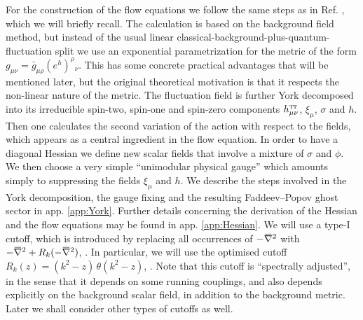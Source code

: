 \documentclass[11pt]{book} %
\newcommand{\overbar}[1]{\mkern 1.5mu\overline{\mkern-1.5mu#1\mkern-1.5mu}\mkern 1.5mu}
\newcommand\TTspace{ -1pt }
\newcommand\hTTmunu{ h^{\scriptscriptstyle{\mathrm{T\hspace{\TTspace}T}}}_{\mu\nu} }
\newcommand{\bnabla}{\overbar \nabla}
\numberwithin{equation}{chapter}
\begin{document}
For the construction of the flow equations we follow the same steps
as in Ref. \cite{Percacci:2015wwa}, which we will briefly recall.
The calculation is based on the background field method,
but instead of the usual linear classical-background-plus-quantum-fluctuation split we
use an exponential parametrization for the metric of the form
$g_{\mu\nu} = \bar g_{\mu\rho}(e^h)^\rho{}_\nu$.
This has some concrete practical advantages that will be mentioned later,
but the original theoretical motivation is that it
respects the non-linear nature of the metric.
The fluctuation field is further York decomposed into its irreducible
spin-two, spin-one and spin-zero components $\hTTmunu$,
$\xi_\mu$, $\sigma$ and $h$.
Then one calculates the second variation of the action with
respect to the fields, which appears as a central ingredient
in the flow equation.
In order to have a diagonal Hessian we define new scalar fields
that involve a mixture of $\sigma$ and $\phi$.
We then choose a very simple ``unimodular physical gauge''
which amounts simply to suppressing the fields $\xi_\mu$ and $h$.
We describe the steps involved in the York decomposition, the
gauge fixing and the resulting Faddeev–Popov ghost sector in app. \ref{app:York}.
Further details concerning the derivation of the Hessian and the flow
equations may be found in app. \ref{app:Hessian}.
We will use a type-I cutoff, which is introduced by replacing
all occurrences of $-\bnabla^2$ with $-\bnabla^2+R_k(-\bnabla^2)$,
\cite{Codello:2008vh}.
In particular, we will use the optimised cutoff
$R_k(z)=\left( k^2-z \right) \, \theta \! \left( k^2-z \right)$, \cite{Litim:2001up}.
Note that this cutoff is ``spectrally adjusted'',
in the sense that it depends on some running couplings,
and also depends explicitly on the background scalar field,
in addition to the background metric.
Later we shall consider other types of cutoffs as well.
\end{document}
